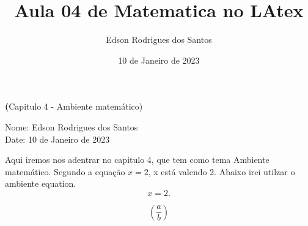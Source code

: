 \documentclass[12pt, a4paper]{article}
\author{Edson Rodrigues dos Santos}
\date{10 de Janeiro de 2023}
\title{Aula 04 de Matematica no LAtex}
\begin{document}
\maketitle
\begin{center}
{\large\textbf(Capitulo 4 - Ambiente matemático)}
\end{center}
\vspace{0.5cm}
\begin{flushleft}
Nome: Edson Rodrigues dos Santos \\
Date: 10 de Janeiro de 2023
\end{flushleft}
\vspace{1cm}

Aqui iremos nos adentrar no capitulo 4, que tem como tema Ambiente matemático. Segundo a equação $ x = 2 $, x está valendo 2. Abaixo irei utilzar o ambiente equation.
\begin{equation}
x = 2.
\end{equation}

\begin{equation}
\left(\frac{a}{b}\right)
\end{equation}
\end{document}
